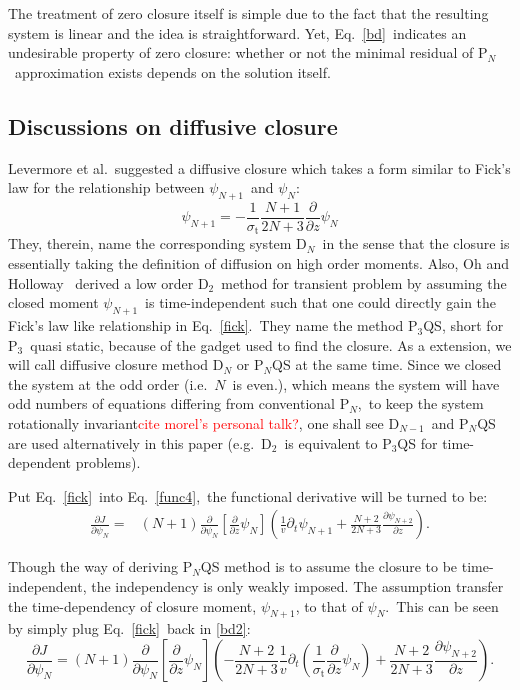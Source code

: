 \documentclass[review]{elsarticle}
\newcommand{\st}{\sigma_\mathrm{t}}
\newcommand{\pn}{P$_N$}
\newcommand{\ppz}{\frac{\partial}{\partial z}}
\newcommand{\psii}[1]{\psi_\ensuremath{{#1}}}
\begin{document}
The treatment of zero closure itself is simple due to the fact that the resulting system is linear and the idea is straightforward. Yet, Eq.~\eqref{bd}~indicates an undesirable property of zero closure: whether or not the minimal residual of \pn~approximation exists depends on the solution itself. 

\subsection{Discussions on diffusive closure}
Levermore et al.~suggested a diffusive closure which takes a form similar to Fick's law for the relationship between $\psii{N+1}$~and $\psii{N}$\cite{levermoredn}:
\begin{equation}\label{fick}
\psii{N+1}=-\frac{1}{\st}\frac{N+1}{2N+3}\ppz\psii{N}
\end{equation}
They, therein, name the corresponding system D$_N$~in the sense that the closure is essentially taking the definition of diffusion on high order moments. Also, Oh and Holloway ~derived a low order D$_2$~method for transient problem by assuming the closed moment $\psii{N+1}$~is time-independent such that one could directly gain the Fick's law like relationship in Eq.~\eqref{fick}\cite{p3qs}.~They name the method P$_3$QS, short for P$_3$~quasi static, because of the gadget used to find the closure. As a extension, we will call diffusive closure method D$_N$ or P$_N$QS at the same time. Since we closed the system at the odd order (i.e.~$N$~is even.), which means the system will have odd numbers of equations differing from conventional \pn,~to keep the system rotationally invariant\textcolor{red}{cite morel's personal talk?}, one shall see D$_{N-1}$~and P$_N$QS are used alternatively in this paper (e.g.~D$_2$~is equivalent to P$_3$QS for time-dependent problems).

Put Eq.~\eqref{fick}~into Eq.~\eqref{func4},~the functional derivative will be turned to be:
\begin{align}\label{bd2}
\frac{\partial J}{\partial\psii{N}}=&(N+1)
\frac{\partial}{\partial\psii{N}}\left[\frac{\partial}{\partial z}\psii{N}\right]
\left(\frac{1}{v}\partial_t\psi_{N+1}+\frac{N+2}{2N+3}\frac{\partial\psi_{N+2}}{\partial z}\right).
\end{align}

Though the way of deriving P$_N$QS method is to assume the closure to be time-independent, the independency is only weakly imposed. The assumption transfer the time-dependency of closure moment, $\psii{N+1}$, to that of $\psii{N}$.~This can be seen by simply plug Eq.~\eqref{fick}~back in \eqref{bd2}:
\begin{equation}
\frac{\partial J}{\partial\psii{N}}=(N+1)
\frac{\partial}{\partial\psii{N}}\left[\frac{\partial}{\partial z}\psii{N}\right]
\left(-\frac{N+2}{2N+3}\frac{1}{v}\partial_t\left(\frac{1}{\st}\ppz\psii{N}\right)+\frac{N+2}{2N+3}\frac{\partial\psi_{N+2}}{\partial z}\right).
\end{equation}
\end{document}
